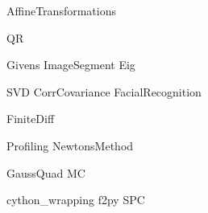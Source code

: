 \documentclass[nociteref]{SIAM-GH-book}
\begin{document}
{AffineTransformations}



{QR}


{Givens}
{ImageSegment}
{Eig}


{SVD}
{CorrCovariance}
{FacialRecognition}

{FiniteDiff}



{Profiling}
{NewtonsMethod}


{GaussQuad}
{MC}

{cython_wrapping}
{f2py}
{SPC}
\end{document}
